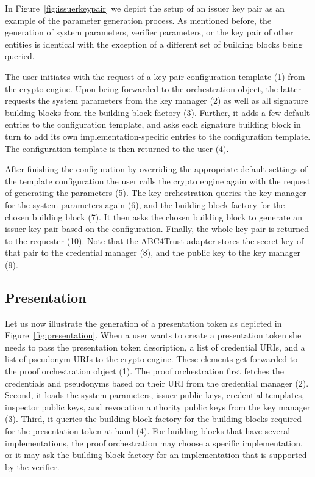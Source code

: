 In Figure~\ref{fig:issuerkeypair} we depict the setup of an issuer key pair as an example 
of the parameter generation process. 
As mentioned before, the generation of system parameters, verifier parameters, or the
key pair of other entities is identical with the exception of a different set of
building blocks being queried. 

The user initiates with the request of a key pair configuration template (1) from the crypto 
engine.
%
Upon being forwarded to the orchestration object, the latter requests the system parameters 
from the key manager (2) as well as all signature building blocks from the building block
factory (3).
%
Further, it adds a few default entries to the configuration template, and asks each 
signature building block
in turn to add its own implementation-specific entries to the configuration template. 
The configuration
template is then returned to the user (4).


After finishing the configuration by overriding the appropriate default settings of the 
template configuration the user calls the crypto engine again with the request of generating
the parameters (5).
%
The key orchestration queries the key manager for the system parameters again (6), and the 
building
block factory for the chosen building block (7). 
It then asks the chosen building block to generate
an issuer key pair based on the configuration. 
Finally, the whole key pair is returned to the requester (10).
%
Note that the ABC4Trust adapter stores the secret key of that pair to the credential manager (8),
and the public key to the key manager (9). 


\subsection{Presentation}
\label{sec:arch:presentation}

Let us now illustrate the generation of a presentation token as depicted in 
Figure~\ref{fig:presentation}.
%
When a user wants to create a presentation token she needs to pass the presentation token
description,  a list of credential URIs, and a list of pseudonym URIs 
to the crypto engine.
%
These elements get forwarded to the proof orchestration object (1).
The proof orchestration first fetches the credentials and pseudonyms based on their URI from the
credential manager (2). 
Second, it loads the system parameters, issuer public keys, credential templates, inspector
public keys, and revocation authority public keys from the key manager (3).
Third, it queries the building block factory for the building blocks required for the presentation
token at hand (4).
For building blocks that have several implementations, the proof orchestration 
may choose a specific implementation, or it may ask the building block factory for
an implementation that is supported by the verifier.

